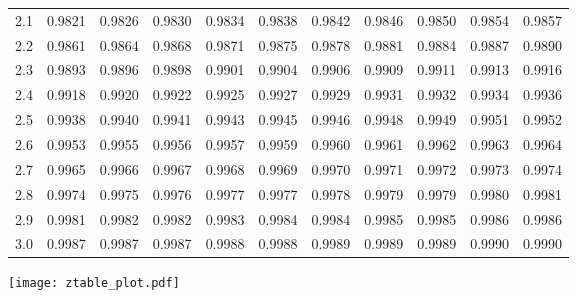 \documentclass{article}
\begin{document}
\begin{center}
\begin{tabular}{lllllllllll}
2.1 & 0.9821 & 0.9826 & 0.9830 & 0.9834 & 0.9838 & 0.9842 & 0.9846 & 0.9850 & 0.9854 & 0.9857 \\
2.2 & \cellcolor{gray!20}0.9861 & \cellcolor{gray!20}0.9864 & \cellcolor{gray!20}0.9868 & \cellcolor{gray!20}0.9871 & \cellcolor{gray!20}0.9875 & \cellcolor{gray!20}0.9878 & \cellcolor{gray!20}0.9881 & \cellcolor{gray!20}0.9884 & \cellcolor{gray!20}0.9887 & \cellcolor{gray!20}0.9890 \\
2.3 & 0.9893 & 0.9896 & 0.9898 & 0.9901 & 0.9904 & 0.9906 & 0.9909 & 0.9911 & 0.9913 & 0.9916 \\
2.4 & \cellcolor{gray!20}0.9918 & \cellcolor{gray!20}0.9920 & \cellcolor{gray!20}0.9922 & \cellcolor{gray!20}0.9925 & \cellcolor{gray!20}0.9927 & \cellcolor{gray!20}0.9929 & \cellcolor{gray!20}0.9931 & \cellcolor{gray!20}0.9932 & \cellcolor{gray!20}0.9934 & \cellcolor{gray!20}0.9936 \\
2.5 & 0.9938 & 0.9940 & 0.9941 & 0.9943 & 0.9945 & 0.9946 & 0.9948 & 0.9949 & 0.9951 & 0.9952 \\
2.6 & \cellcolor{gray!20}0.9953 & \cellcolor{gray!20}0.9955 & \cellcolor{gray!20}0.9956 & \cellcolor{gray!20}0.9957 & \cellcolor{gray!20}0.9959 & \cellcolor{gray!20}0.9960 & \cellcolor{gray!20}0.9961 & \cellcolor{gray!20}0.9962 & \cellcolor{gray!20}0.9963 & \cellcolor{gray!20}0.9964 \\
2.7 & 0.9965 & 0.9966 & 0.9967 & 0.9968 & 0.9969 & 0.9970 & 0.9971 & 0.9972 & 0.9973 & 0.9974 \\
2.8 & \cellcolor{gray!20}0.9974 & \cellcolor{gray!20}0.9975 & \cellcolor{gray!20}0.9976 & \cellcolor{gray!20}0.9977 & \cellcolor{gray!20}0.9977 & \cellcolor{gray!20}0.9978 & \cellcolor{gray!20}0.9979 & \cellcolor{gray!20}0.9979 & \cellcolor{gray!20}0.9980 & \cellcolor{gray!20}0.9981 \\
2.9 & 0.9981 & 0.9982 & 0.9982 & 0.9983 & 0.9984 & 0.9984 & 0.9985 & 0.9985 & 0.9986 & 0.9986 \\
3.0 & \cellcolor{gray!20}0.9987 & \cellcolor{gray!20}0.9987 & \cellcolor{gray!20}0.9987 & \cellcolor{gray!20}0.9988 & \cellcolor{gray!20}0.9988 & \cellcolor{gray!20}0.9989 & \cellcolor{gray!20}0.9989 & \cellcolor{gray!20}0.9989 & \cellcolor{gray!20}0.9990 & \cellcolor{gray!20}0.9990 \\
\bottomrule
\end{tabular}

\bigskip
\texttt{[image: ztable\_plot.pdf]}
\end{center}
\end{document}
